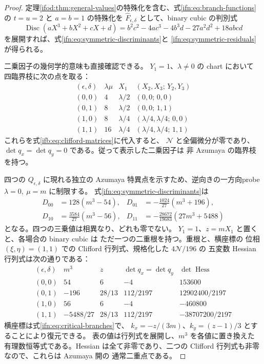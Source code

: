 \begin{proof}
定理\ref{ifod:thm:general-values}の特殊化を含む、式\eqref{ifn:eq:branch-functions}の $t=u=2$ と $a=b=1$ の特殊化を
$\widehat F_{\epsilon,\delta}$ として、binary cubic の判別式
\[
  \operatorname{Disc}(aX^3+bX^2+cX+d)
  =b^2c^2-4ac^3-4b^3d-27a^2d^2+18abcd
\]
を展開すれば、式\eqref{ifn:eq:symmetric-discriminants}と
\eqref{ifn:eq:symmetric-residuals}が得られる。

二乗因子の幾何学的意味も直接確認できる。
$Y_1=1$、$\lambda\ne0$ の chart において
四臨界枝に次の点を取る：
\[
\begin{array}{c|c|c|c}
(\epsilon,\delta)&\lambda\mu&X_1&
 (X_2,X_3;\,Y_2,Y_3)\\\hline
(0,0)&4&\lambda/2&(0,0;\,0,0)\\
(0,1)&8&\lambda/2&(0,0;\,1,1)\\
(1,0)&8&\lambda/4&(\lambda/4,\lambda/4;\,0,0)\\
(1,1)&16&\lambda/4&(\lambda/4,\lambda/4;\,1,1)
\end{array}
\]
これらを式\eqref{ifb:eq:clifford-matrices}に代入すると、
$\mathcal N$ と全偏微分が零であり、
$\det q_x=\det q_y=0$ である。従って表示した二乗因子は
非 Azumaya の臨界枝を持つ。

四つの $Q_{\epsilon,\delta}$ に現れる独立の Azumaya
特異点を示すため、逆向きの一方向probe
$\lambda=0,\ \mu=m$ に制限する。
式\eqref{ifn:eq:symmetric-discriminants}は
\begin{equation}\label{ifn:eq:probe-four-discriminants}
\begin{aligned}
 D_{00}&=128(m^3-54),&
 D_{01}&=-\frac{1024}{27}(m^3+196),\\
 D_{10}&=\frac{3584}{27}(m^3-56),&
 D_{11}&=-\frac{28672}{19683}(27m^3+5488)
\end{aligned}
\end{equation}
となる。四つの三乗値は相異なり、どれも零でない。
$Y_1=1$、$z=mX_1$ と置くと、各場合の binary cubic は
ただ一つの二重根を持つ。重根と、横座標の
位相 $(\xi,\eta)=(1,1)$ での
Clifford 行列式、規格化した $4\mathcal N/196$ の
五変数 Hessian 行列式は次の通りである：
\begin{equation}\label{ifn:eq:probe-witnesses}
\begin{array}{c|c|c|c|c}
(\epsilon,\delta)&m^3&z&
 \det q_x=\det q_y&\det\operatorname{Hess}\\\hline
(0,0)&54&6&-4&153600\\
(0,1)&-196&28/13&112/2197&12902400/2197\\
(1,0)&56&6&-4&-460800\\
(1,1)&-5488/27&28/13&112/2197&-38707200/2197
\end{array}
\end{equation}
横座標は式\eqref{ifn:eq:critical-branches}で、
$k_x=-z/(3m)$、$k_y=(z-1)/3$ とすることにより復元できる。
表の値は行列式を展開し、$m^3$ を各値に置き換えた
有理数恒等式である。Hessian は全て非零であり、二つの
Clifford 行列式も非零なので、これらは Azumaya 開の
通常二重点である。


\end{proof}
